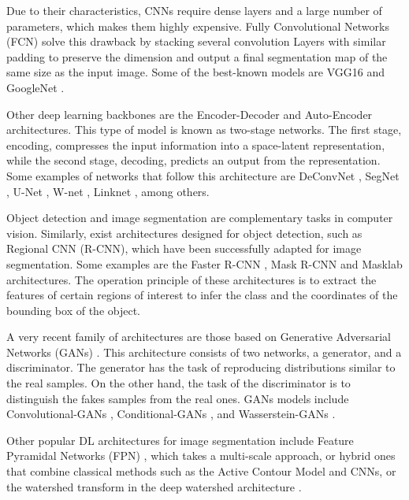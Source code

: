 Due to their characteristics, CNNs require dense layers and a large number of parameters, which makes them highly expensive. Fully Convolutional Networks (FCN) \citep{Long.Shelhamer.ea:CVPR:2015} solve this drawback by stacking several convolution Layers with similar padding to preserve the dimension and output a final segmentation map of the same size as the input image. Some of the best-known models are VGG16 and GoogleNet \citep{Szegedy.Liu.ea:arXiv:2014}.

Other deep learning backbones are the Encoder-Decoder and Auto-Encoder architectures. This type of model is known as two-stage networks. The first stage, encoding, compresses the input information into a space-latent representation, while the second stage, decoding, predicts an output from the representation. Some examples of networks that follow this architecture are DeConvNet \citep{Noh.Hong.ea:ICCV:2015}, SegNet \citep{Badrinarayanan.Kendall.ea:PAMI:2017}, U-Net \citep{Ronneberger.Fischer.ea:MICCAI:2015}, W-net \citep{Xia.Kulis:arXiv:2017}, Linknet \citep{Chaurasia.Culurciello:VCIP:2017}, among others.

Object detection and image segmentation are complementary tasks in computer vision. Similarly, exist architectures designed for object detection, such as Regional CNN (R-CNN), which have been successfully adapted for image segmentation. Some examples are the Faster R-CNN \citep{Ren.He.ea:PAMI:2017}, Mask R-CNN \citep{He.Gkioxari.ea:PAMI:2020} and Masklab \citep{Chen.Hermans.ea:CVPR:2018} architectures. The operation principle of these architectures is to extract the features of certain regions of interest to infer the class and the coordinates of the bounding box of the object.

A very recent family of architectures are those based on Generative Adversarial Networks (GANs) \citep{Goodfellow.Pouget-Abadie.ea:NIPS:2014}. This architecture consists of two networks, a generator, and a discriminator. The generator has the task of reproducing distributions similar to the real samples. On the other hand, the task of the discriminator is to distinguish the fakes samples from the real ones. GANs models include Convolutional-GANs \citep{Radford.Metz.ea:arXiv:2016}, Conditional-GANs \citep{Mirza.Osindero:arXiv:2014}, and Wasserstein-GANs \citep{Arjovsky.Chintala.ea:arXiv:2017}.

Other popular DL architectures for image segmentation include Feature Pyramidal Networks (FPN) \citep{Lin.Dollar.ea:CVPR:2017}, which takes a multi-scale approach, or hybrid ones that combine classical methods such as the Active Contour Model \citep{Kass.Witkin.ea:JCV:1988} and CNNs, or the watershed transform in the deep watershed architecture \citep{Bai.Urtasun:CVPR:2017}. 

